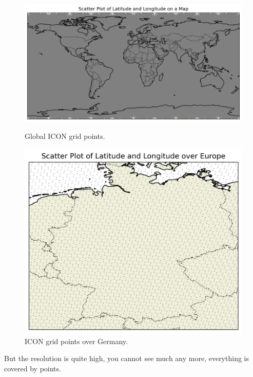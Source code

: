 \begin{figure}[ht]
    \centering
    \begin{minipage}{0.5\textwidth}
        \centering
        \includegraphics[width=\textwidth]{images/icon_points_global.png}
        \caption{Global ICON grid points.}
        \label{fig:t2m_global_interp}
    \end{minipage}
    \hfill
    \begin{minipage}{0.4\textwidth}
        \centering
        \includegraphics[width=\textwidth]{images/icon_points_germany.png}
        \caption{ICON grid points over Germany.}
        \label{fig:t2m_germany_interp}
    \end{minipage}
\end{figure}

But the resolution is quite high, you cannot see much any more, everything is covered by points. 


